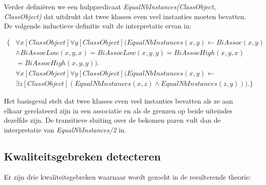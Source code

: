 Verder defini\"eren we een hulppredicaat \textit{EqualNbInstances(ClassObject, ClassObject)} dat uitdrukt dat twee klasses even veel instanties moeten bevatten. De volgende inductieve definitie vult de interpretatie ervan in:

\begin{align*}
\{
&\forall{x}[ClassObject]\forall{y}[ClassObject](EqualNbInstances(x, y) \leftarrow BiAssoc(x, y) \\ &\land BiAssocLow(x, y, x) = BiAssocLow(x, y, y) = BiAssocHigh(x, y, x) \\ &= BiAssocHigh(x, y, y)). \\
&\forall{x}[ClassObject]\forall{y}[ClassObject](EqualNbInstances(x, y) \leftarrow \\ &\exists{z}[ClassObject](EqualNbInstances(x, z) \land EqualNbInstances(z, y))).
\}
\end{align*}

Het basisgeval stelt dat twee klasses even veel instanties bevatten als ze aan elkaar gerelateerd zijn in een associatie en als de grenzen op beide uiteindes dezelfde zijn. De transitieve sluiting over de bekomen paren vult dan de interpretatie van \textit{EqualNbInstances/2} in.

\subsection{Kwaliteitsgebreken detecteren}
Er zijn drie kwaliteitsgebreken waarnaar wordt gezocht in de resulterende theorie:

